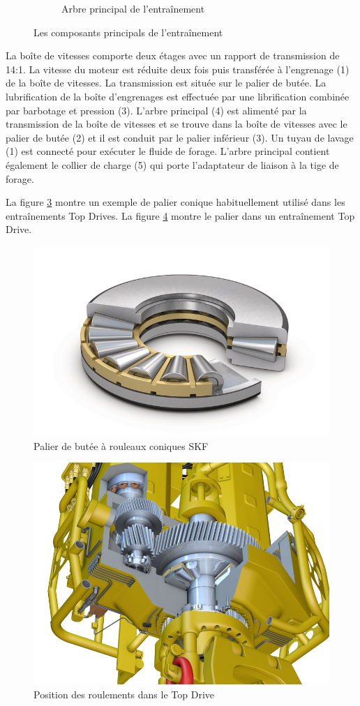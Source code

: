 \begin{figure}[H]
\begin{subfigure}[t]{0.4\textwidth}
	 \label{fig:topdrive-drillingunit-drive-mainshaft}
	 \caption{Arbre principal de l'entraînement}
     \end{subfigure}
	\caption{Les composants principals de l'entraînement}%
	\label{fig:topdrive-drillingunit-drive-components}
\end{figure}

La boîte de vitesses comporte deux étages avec un rapport de transmission de 14:1. La vitesse du moteur est réduite deux fois puis transférée à l'engrenage (1) de la boîte de vitesses. La transmission est située sur le palier de butée. La lubrification de la boîte d'engrenages est effectuée par une librification combinée par barbotage et pression (3). L'arbre principal (4) est alimenté par la transmission de la boîte de vitesses et se trouve dans la boîte de vitesses avec le palier de butée (2) et il est conduit par le palier inférieur (3). Un tuyau de lavage (1) est connecté pour exécuter le fluide de forage. L'arbre principal contient également le collier de charge (5) qui porte l'adaptateur de liaison à la tige de forage.

La figure \ref{fig:skf_tapered_roller_thrust_bearing} montre un exemple de palier conique habituellement utilisé dans les entraînements Top Drives. La figure \ref{fig:skf_topdrive} montre le palier dans un entraînement Top Drive.

\begin{figure}[H]
	\centering
	\includegraphics[width=0.6\linewidth]{figures/skf_tapered_roller_thrust_bearing.png}
	\caption{Palier de butée à rouleaux coniques SKF \cite{skf_tapered_roller_thurst_bearing}}%
	\label{fig:skf_tapered_roller_thrust_bearing}
\end{figure}

\begin{figure}[H]
	\centering
	\includegraphics[width=0.7\linewidth]{figures/skf_topdrive.png}
	\caption{Position des roulements dans le Top Drive \cite{skf_bearing}}%
	\label{fig:skf_topdrive}
\end{figure}

